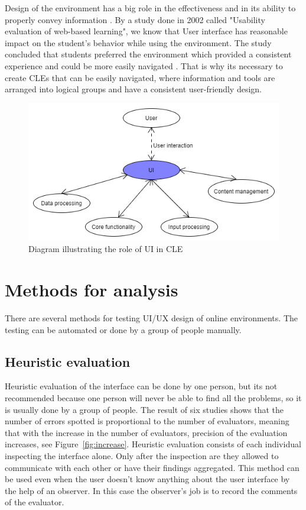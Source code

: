 \documentclass[10pt,english,a4paper]{article}
\begin{document}
Design of the environment has a big role in the effectiveness and in 
its ability to properly convey information \cite{ui/ux}. 
By a study done in 2002 called "Usability evaluation of web-based learning", we know that User interface
has reasonable impact on the student's behavior while using the environment\cite{wesson_2002_usability}.
The study concluded that students preferred the environment which provided a consistent experience and could be more easily navigated 
\cite{wesson_2002_usability}. That is why its necessary to create CLEs that can be easily navigated,
where information and tools are arranged into logical groups and have a consistent user-friendly design.

\begin{figure}[h]
    \includegraphics[width=1\textwidth]{images/ui-diagram2.png}
    \caption{Diagram illustrating the role of UI in CLE}
\end{figure}


\section{Methods for analysis}\label{methods}
There are several methods for testing UI/UX design of online environments. The testing 
can be automated or done by a group of people manually.

\subsection{Heuristic evaluation}
Heuristic evaluation of the interface can be done by one person, but
its not recommended because one person will never be able to
find all the problems, so it is usually done by a group of people\cite{a2020_heuristic}. 
The result of six studies shows that the number of errors spotted is proportional to the number of evaluators,
meaning that with the increase in the number of evaluators, precision of the evaluation increases, see Figure~\ref{fig:increase}.
Heuristic evaluation consists of each individual inspecting the interface alone. Only after the
inspection are they allowed to communicate with each other or have their findings aggregated\cite{a2020_heuristic}.
This method can be used even when the user doesn't know anything about the user interface by
the help of an observer. In this case the observer's job is to record the comments of the evaluator\cite{a2020_heuristic}.
\end{document}
